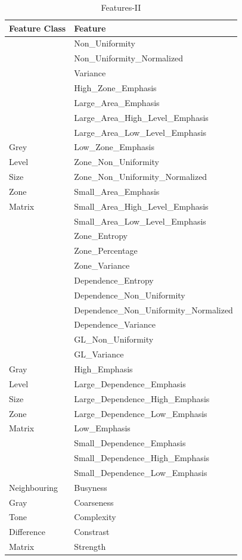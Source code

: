 \documentclass[final,1p,times,twocolumn]{elsarticle}
\begin{document}
\begin{table}[!b]
\scriptsize
\centering
\caption{Features-II}
\label{tb4}
\begin{tabular}{| l | l |}
\hline
\textbf{Feature Class} & \textbf{Feature}\\
\hline
&Non\_Uniformity\\
&Non\_Uniformity\_Normalized\\
&Variance\\
&High\_Zone\_Emphasis\\
&Large\_Area\_Emphasis\\
&Large\_Area\_High\_Level\_Emphasis\\
&Large\_Area\_Low\_Level\_Emphasis\\
Grey&Low\_Zone\_Emphasis\\
Level&Zone\_Non\_Uniformity\\
Size&Zone\_Non\_Uniformity\_Normalized\\
Zone&Small\_Area\_Emphasis\\
Matrix&Small\_Area\_High\_Level\_Emphasis\\
&Small\_Area\_Low\_Level\_Emphasis\\
&Zone\_Entropy\\
&Zone\_Percentage\\
&Zone\_Variance\\
\hline
&Dependence\_Entropy\\
&Dependence\_Non\_Uniformity\\
&Dependence\_Non\_Uniformity\_Normalized\\
&Dependence\_Variance\\
&GL\_Non\_Uniformity\\
&GL\_Variance\\
Gray &High\_Emphasis\\
Level &Large\_Dependence\_Emphasis\\
Size&Large\_Dependence\_High\_Emphasis\\
Zone&Large\_Dependence\_Low\_Emphasis\\
Matrix&Low\_Emphasis\\
&Small\_Dependence\_Emphasis\\
&Small\_Dependence\_High\_Emphasis\\
&Small\_Dependence\_Low\_Emphasis\\
\hline
Neighbouring&Busyness\\
Gray&Coarseness\\
Tone&Complexity\\
Difference&Constrast\\
Matrix&Strength\\
\hline
\end{tabular}
\end{table}
\end{document}

